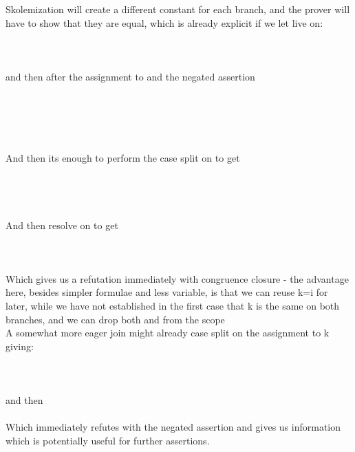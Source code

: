\begin{itemize}
\begin{itemize}
			Skolemization will create a different constant for each branch, and the prover will have to show that they are equal, which is already explicit if we let  live on: \\
			  \\
			  \\
			  \\
			and then after the assignment to  and the negated assertion\\
			  \\
			  \\
			 \\
			 \\
			 \\
			And then its enough to perform the case split on  to get \\
			 \\
			 \\
			 \\
			 \\
			And then resolve on  to get \\
			 \\
			 \\
			 \\
			Which gives us a refutation immediately with congruence closure - the advantage here, besides simpler formulae and less variable, is that we can reuse k=i for later, while we have not established in the first case that k is the same on both branches, and we can drop both  and  from the scope \\
			A somewhat more eager join might already case split on the assignment to k giving:\\
			 \\
			 \\
			 \\
			and then \\
			 \\
			Which immediately refutes with the negated assertion and gives us information which is potentially useful for further assertions.



\end{itemize}
\end{itemize}
